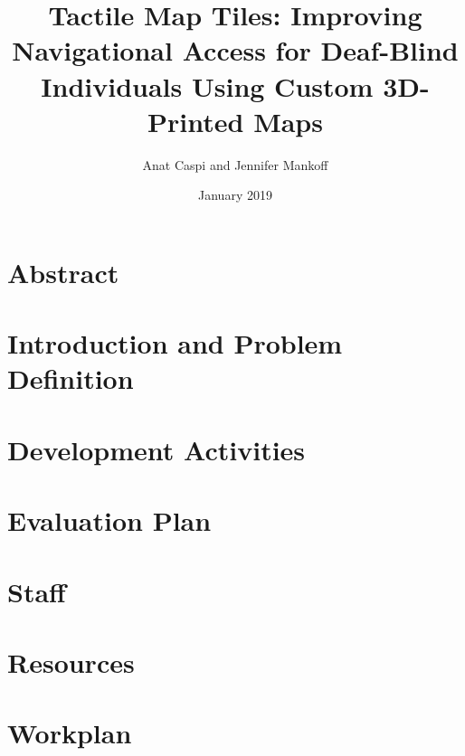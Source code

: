 \documentclass[12pt,letterpaper]{article}
\title{Tactile Map Tiles: Improving Navigational Access for Deaf-Blind Individuals Using Custom 3D-Printed Maps}
\author{Anat Caspi and Jennifer Mankoff}
\date{January 2019}
\begin{document}
\maketitle
\thispagestyle{empty}

\tableofcontents
\clearpage
\section*{Abstract}
{

\normalsize

}

\clearpage
{} 

%
\section{Introduction and Problem Definition}

\section{Development Activities}

%
\section{Evaluation Plan}


\section{Staff}

\section{Resources}

\section{Workplan}

\end{document}
